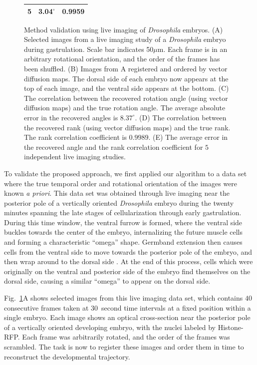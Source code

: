 \documentclass[twocolumn, 10pt]{article}
\newcommand{\fig}[0]{Fig.}
\begin{document}
\begin{figure}[t]
{{{\begin{tabular}{ |c | c| c| }
5 & 3.04$^{\circ}$ & 0.9959 \\
 \hline
\end{tabular}}}}
\caption{Method validation using live imaging of \textit{Drosophila} embryos. (A) Selected images from a live imaging study of a \textit{Drosophila} embryo during gastrulation. Scale bar indicates 50$\mu$m. Each frame is in an arbitrary rotational orientation, and the order of the frames has been shuffled. (B) Images from A registered and ordered by vector diffusion maps. The dorsal side of each embryo now appears at the top of each image, and the ventral side appears at the bottom. (C) The correlation between the recovered rotation angle (using vector diffusion maps) and the true rotation angle. The average absolute error in the recovered angles is $8.37 ^\circ$. (D) The correlation between the recovered rank (using vector diffusion maps) and the true rank. The rank correlation coefficient is $0.9989$. (E) The average error in the recovered angle and the rank correlation coefficient for $5$ independent live imaging studies. }
\label{fig:drosophila_live_imaging}
\end{figure}

To validate the proposed approach, we first applied our algorithm to a data set where the true temporal order and rotational orientation of the images were known {\em a priori}.
%
This data set was obtained through live imaging near the posterior pole of a vertically oriented {\it Drosophila} embryo during the twenty minutes spanning the late stages of cellularization through early gastrulation.
%
During this time window, the ventral furrow is formed, where the ventral side buckles towards the center of the embryo, internalizing the future muscle cells and forming a characteristic ``omega'' shape.
%
Germband extension then causes cells from the ventral side to move towards the posterior pole of the embryo, and then wrap around to the dorsal side \citep{leptin2005gastrulation}.
%
At the end of this process, cells which were originally on the ventral and posterior side of the embryo find themselves on the dorsal side, causing a similar ``omega'' to appear on the dorsal side.

\fig~\ref{fig:drosophila_live_imaging}A shows selected images from this live imaging data set, which contains $40$ consecutive frames taken at $30$~second time intervals at a fixed position within a single embryo.
%
Each image shows an optical cross-section near the posterior pole of a vertically oriented developing embryo, with the nuclei labeled by Histone-RFP.
%
Each frame was arbitrarily rotated, and the order of the frames was scrambled.
%
The task is now to register these images and order them in time to reconstruct the developmental trajectory.
\end{document}
